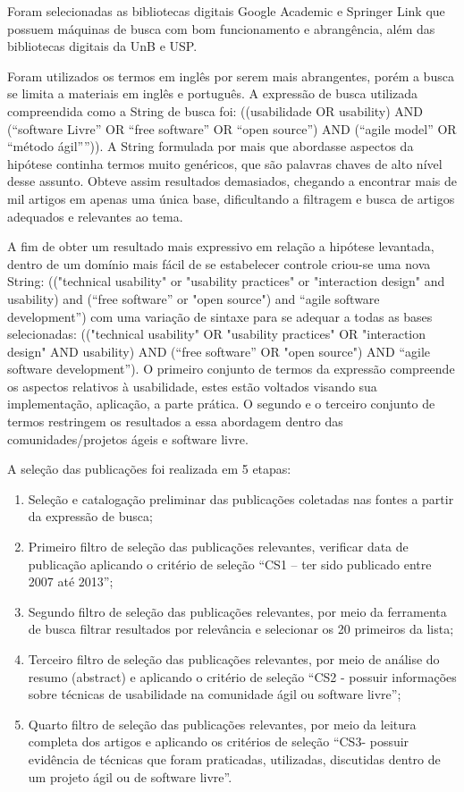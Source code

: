\documentclass[12pt]{article}
\begin{document}
%
Foram selecionadas as bibliotecas digitais Google Academic e Springer Link que possuem máquinas de busca com bom funcionamento e abrangência, além das bibliotecas digitais da UnB e USP.

%
Foram utilizados os termos em inglês por serem mais abrangentes, porém a busca se limita a materiais em inglês e português. A expressão de busca utilizada compreendida como a String de busca foi: ((usabilidade OR usability) AND (“software Livre” OR “free software” OR “open source”) AND (“agile model” OR “método ágil””)). A String formulada por mais que abordasse aspectos da hipótese continha termos muito genéricos, que são palavras chaves de alto nível desse assunto. Obteve assim resultados demasiados, chegando a encontrar mais de mil artigos em apenas uma única base, dificultando a filtragem e busca de artigos adequados e relevantes ao tema.

%
A fim de obter um resultado mais expressivo em relação a hipótese levantada, dentro de um domínio mais fácil de se estabelecer controle criou-se uma nova String: (("technical usability" or "usability practices" or "interaction design" and usability) and (“free software” or "open source") and “agile software development”) com uma variação de sintaxe para se adequar a todas as bases selecionadas: (("technical usability" OR "usability practices" OR "interaction design" AND usability) AND (“free software” OR "open source") AND “agile software development”). O primeiro conjunto de termos da expressão compreende os aspectos relativos à usabilidade, estes estão voltados visando sua implementação, aplicação, a parte prática. O segundo e o terceiro conjunto de termos restringem os resultados a essa abordagem dentro das comunidades/projetos ágeis e software livre.

%
A seleção das publicações foi realizada em 5 etapas:

\begin{enumerate}
\item Seleção e catalogação preliminar das publicações coletadas nas fontes a partir da expressão de busca;
\item Primeiro filtro de seleção das publicações relevantes, verificar data de publicação aplicando o critério de seleção “CS1 – ter sido publicado entre 2007 até 2013”;
\item Segundo filtro de seleção das publicações relevantes, por meio da ferramenta de busca filtrar resultados por relevância e selecionar os 20 primeiros da lista;
\item Terceiro filtro de seleção das publicações relevantes, por meio de análise do resumo (abstract) e aplicando o critério de seleção “CS2 - possuir informações sobre técnicas de usabilidade na comunidade ágil ou software livre”;
\item Quarto filtro de seleção das publicações relevantes, por meio da leitura completa dos artigos e aplicando os critérios de seleção “CS3- possuir evidência de técnicas que foram praticadas, utilizadas, discutidas dentro de um projeto ágil ou de software livre”.
\end{enumerate}
\end{document}
